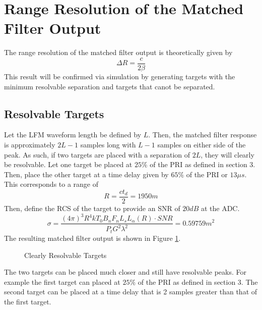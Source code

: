 \documentclass[12pt,letterpaper]{article}
\begin{document}
\section{Range Resolution of the Matched Filter Output}
The range resolution of the matched filter output is theoretically given by
\begin{equation}
\Delta R = \frac{c}{2\beta}
\end{equation}
This result will be confirmed via simulation by generating targets with the minimum resolvable separation and targets that canot be separated.
\subsection{Resolvable Targets}
Let the LFM waveform length be defined by $L$. Then, the matched filter response is approximately $2L-1$ samples long with $L-1$ samples on either side of the peak. As such, if two targets are placed with a separation of $2L$, they will clearly be resolvable. Let one target be placed at $25\%$ of the PRI as defined in section 3. Then, place the other target at a time delay given by $65\%$ of the PRI or $13\mu s$. This corresponds to a range of
\begin{equation}
R = \frac{ct_d}{2} = 1950 m
\end{equation}
Then, define the RCS of the target to provide an SNR of $20dB$ at the ADC.
\begin{equation}
\sigma = \frac{(4\pi)^3 R^4 k T_0 B_n F_n L_s L_\alpha(R)\cdot SNR}{P_t G^2 \lambda^2} = 0.59759  m^2
\end{equation}
The resulting matched filter output is shown in Figure \ref{Clearly Resolvable}.
\begin{figure}[H]
\caption{Clearly Resolvable Targets}
\label{Clearly Resolvable}
\end{figure}
\noindent
The two targets can be placed much closer and still have resolvable peaks. For example the first target can placed at $25\%$ of the PRI as defined in section 3. The second target can be placed at a time delay that is 2 samples greater than that of the first target.
\end{document}
